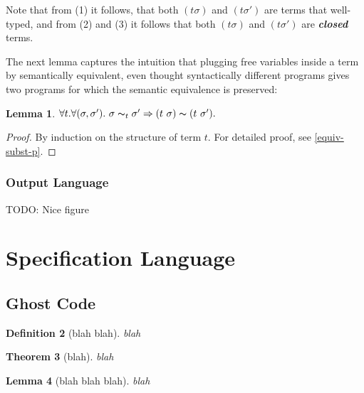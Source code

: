 \documentclass[a4paper,11pt,oneside]{article}
\theoremstyle{plain}
\newtheorem{definition}{Definition}[subsection]
\newtheorem{lemma}[definition]{Lemma}
\newtheorem{theorem}[definition]{Theorem}
\newcommand{\tmapp}[2]{(#1 ~ #2)}
\newcommand{\eqvsbst}[2]{#1 \thicksim_{#2} #1'}
\begin{document}
	Note that from (1) it follows, that both $(t\sigma)$ and 
	$(t\sigma')$ are terms that well-typed, and from (2) and (3) it follows 
	that both $(t\sigma)$ and	 $(t\sigma')$ are \textit{\textbf{closed}} terms.
	
	The next lemma captures the intuition that plugging free variables inside a term by semantically equivalent, even thought syntactically different programs gives two programs for which the semantic equivalence is preserved:
	
	\begin{lemma} 
		$\forall t. \forall (\sigma, \sigma'). ~\eqvsbst{\sigma}{t}
		\Rightarrow \tmapp{t}{\sigma} \thicksim \tmapp{t}{\sigma'}.$ 
	\label{equiv-subst-l}
	\end{lemma}

	\begin{proof}
		By induction on the structure of term $t$. For detailed proof, see
		\ref{equiv-subst-p}.
	\end{proof}


\subsubsection*{Output Language}
TODO: Nice figure 


\newpage
\section{Specification Language}

\subsection{Ghost Code}

\begin{definition}[blah blah] blah
\end{definition}

\begin{theorem}[blah] 
blah
\end{theorem}

\begin{lemma}[blah blah blah]
blah
\end{lemma}
\end{document}
